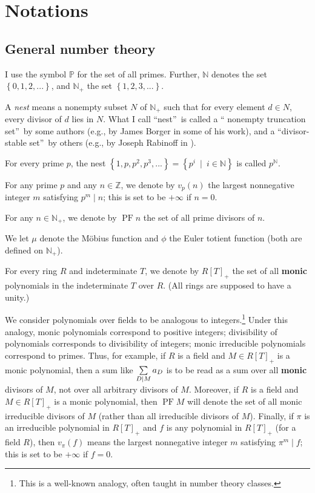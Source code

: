 \documentclass[numbers=enddot,12pt,final,onecolumn,notitlepage]{scrartcl}%
\theoremstyle{definition}
\let\sumnonlimits\sum
\renewcommand{\sum}{\sumnonlimits\limits}
\begin{document}
\section{\label{sect.nots}Notations}

\subsection{General number theory}

I use the symbol $\mathbb{P}$ for the set of all primes. Further, $\mathbb{N}$
denotes the set $\left\{  0,1,2,...\right\}  $, and $\mathbb{N}_{+}$ the set
$\left\{  1,2,3,...\right\}  $.

A \textit{nest} means a nonempty subset $N$ of $\mathbb{N}_{+}$ such that for
every element $d\in N$, every divisor of $d$ lies in $N$. What I call
\textquotedblleft nest\textquotedblright\ is called a \textquotedblleft
nonempty truncation set\textquotedblright\ by some authors (e.g., by James
Borger in some of his work), and a \textquotedblleft divisor-stable
set\textquotedblright\ by others (e.g., by Joseph Rabinoff in
\cite{rabinoff-witt}).

For every prime $p$, the nest $\left\{  1,p,p^{2},p^{3},...\right\}  =\left\{
p^{i}\ \mid\ i\in\mathbb{N}\right\}  $ is called $p^{\mathbb{N}}$.

For any prime $p$ and any $n\in\mathbb{Z}$, we denote by $v_{p}\left(
n\right)  $ the largest nonnegative integer $m$ satisfying $p^{m}\mid n$; this
is set to be $+\infty$ if $n=0$.

For any $n\in\mathbb{N}_{+}$, we denote by $\operatorname{PF}n$ the set of all
prime divisors of $n$.

We let $\mu$ denote the M\"{o}bius function and $\phi$ the Euler totient
function (both are defined on $\mathbb{N}_{+}$).

For every ring $R$ and indeterminate $T$, we denote by $R\left[  T\right]
_{+}$ the set of all \textbf{monic} polynomials in the indeterminate $T$ over
$R$. (All rings are supposed to have a unity.)

We consider polynomials over fields to be analogous to integers.\footnote{This
is a well-known analogy, often taught in number theory classes.} Under this
analogy, monic polynomials correspond to positive integers; divisibility of
polynomials corresponds to divisibility of integers; monic irreducible
polynomials correspond to primes. Thus, for example, if $R$ is a field and
$M\in R\left[  T\right]  _{+}$ is a monic polynomial, then a sum like
$\sum\limits_{D\mid M}a_{D}$ is to be read as a sum over all \textbf{monic}
divisors of $M$, not over all arbitrary divisors of $M$. Moreover, if $R$ is a
field and $M\in R\left[  T\right]  _{+}$ is a monic polynomial, then
$\operatorname*{PF}M$ will denote the set of all monic irreducible divisors of
$M$ (rather than all irreducible divisors of $M$). Finally, if $\pi$ is an
irreducible polynomial in $R\left[  T\right]  _{+}$ and $f$ is any polynomial
in $R\left[  T\right]  _{+}$ (for a field $R$), then $v_{\pi}\left(  f\right)
$ means the largest nonnegative integer $m$ satisfying $\pi^{m}\mid f$; this
is set to be $+\infty$ if $f=0$.
\end{document}
